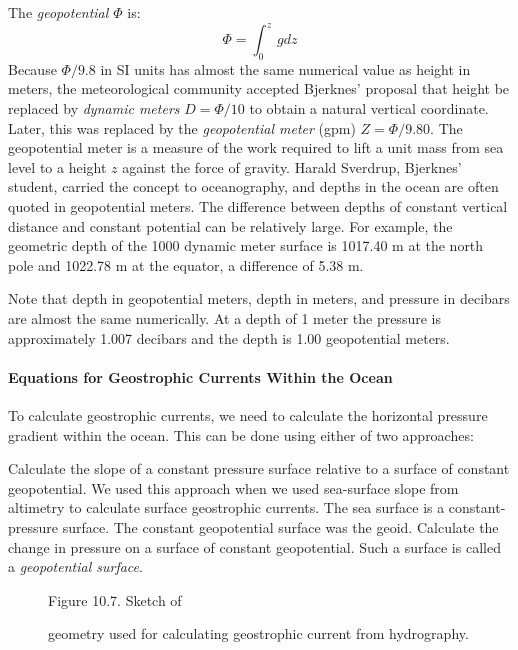 The \textit{geopotential $\Phi$} is:
\begin{equation}
\Phi =\int_0^z\,g dz
\end{equation}
Because $\Phi/9.8$ in SI units has almost the same numerical value as height in meters,
the meteorological community accepted Bjerknes' proposal that height be replaced by
\textit{dynamic meters} $D =
\Phi/10$ to obtain a natural vertical coordinate. Later, this was replaced by the
\textit{geopotential meter} (gpm) $Z = \Phi/9.80$. The
geopotential meter is a measure of the work required to lift a unit mass from sea level
to a height $z$ against the force of gravity. Harald Sverdrup, Bjerknes' student,
carried the concept to oceanography, and depths in the ocean are often quoted in
geopotential meters. The difference between depths of constant vertical distance and
constant potential can be relatively large. For example, the geometric depth of the 1000
dynamic meter surface is 1017.40 m at the north pole and 1022.78 m at the equator, a
difference of 5.38 m.

Note that depth in geopotential meters, depth in meters, and pressure in decibars
are almost the same numerically. At a depth of 1 meter the pressure is
approximately 1.007 decibars and the depth is 1.00 geopotential meters.

\paragraph{Equations for Geostrophic Currents Within the Ocean}
To calculate geo\-strophic currents, we need to calculate the horizontal
pressure gradient with\-in the ocean. This can be done using either of two approaches:
\begin{enumerate}
\vitem Calculate the slope of a constant pressure surface relative to a surface of
constant geopotential. We used this approach when we used sea-surface slope from
altimetry to calculate surface geostrophic currents. The sea surface is a
constant-pressure surface. The constant geopotential surface was the geoid.
\vitem Calculate the change in pressure on a
surface of constant geopotential. Such a surface is called a \textit{geopotential
surface}.
\end{enumerate}

\begin{figure}[h!]
\vspace{-2ex}
\centering
\footnotesize
Figure 10.7. Sketch of \rule{0mm}{3ex}geometry used for calculating
geostrophic current from hydrography.

\label{fig:hydrosketch}
\vspace{-2ex}
\end{figure}

